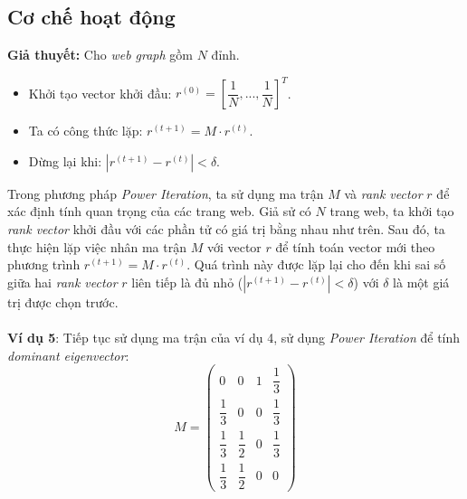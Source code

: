         \subsection{Cơ chế hoạt động \cite{power_method}}
            \textbf{Giả thuyết:} Cho \emph{web graph} gồm $N$ đỉnh.
            \begin{itemize}
                \item Khởi tạo vector khởi đầu: $r^{(0)} = \left[\dfrac{1}{N},...,\dfrac{1}{N}\right]^T$.\
                \item Ta có công thức lặp: $r^{(t+1)} = M \cdot r^{(t)}$.
                \item Dừng lại khi: $ {| r^{(t+1)} - r^{(t)} |}  < \delta$.
            \end{itemize}
            Trong phương pháp \emph{Power Iteration}, ta sử dụng ma trận $M$ và \emph{rank vector} $r$ để xác định tính quan trọng của các trang web. Giả sử có $N$ trang web, ta khởi tạo \textit{rank vector} khởi đầu với các phần tử có giá trị bằng nhau như trên. Sau đó, ta thực hiện lặp việc nhân ma trận $M$ với vector $r$ để tính toán vector mới theo phương trình $r^{(t+1)} = M \cdot r^{(t)}$. Quá trình này được lặp lại cho đến khi sai số giữa hai \emph{rank vector} $r$ liên tiếp là đủ nhỏ ($|r^{(t+1)} - r^{(t)}| < \delta$) với $\delta$ là một giá trị được chọn trước.\\\\
        \textbf{Ví dụ 5}:
            Tiếp tục sử dụng ma trận của ví dụ 4, sử dụng \emph{Power Iteration} để tính \emph{dominant eigenvector}:\\
            $$ M = 
            \begin{pmatrix}
                  0 & 0 & 1 & \dfrac{1}{3} \\[10pt]
                \dfrac{1}{3} & 0 & 0 & \dfrac{1}{3} \\[10pt]
                \dfrac{1}{3} & \dfrac{1}{2} & 0 & \dfrac{1}{3} \\[10pt]
                \dfrac{1}{3} & \dfrac{1}{2} & 0 & 0
            \end{pmatrix}
            $$
